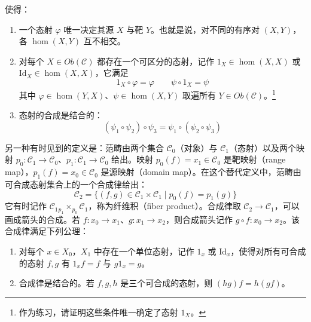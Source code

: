 使得：

\begin{enumerate}
  \item 一个态射 $\varphi$ 唯一决定其源 $X$ 与靶 $Y$。也就是说，对不同的有序对 $(X,Y)$，各 $\hom(X,Y)$ 互不相交。
  \item 对每个 $X\in\mathit{Ob}(\mathcal{C})$ 都存在一个可区分的态射，记作 $1_X\in\hom(X,X)$ 或 $\mathrm{Id}_X\in\hom(X,X)$，它满足
  \begin{equation}
  1_X\circ\varphi=\varphi \qquad \psi\circ 1_X=\psi
  \tag{K.4}
  \label{eq:K.4}
  \end{equation}
  其中 $\varphi\in\hom(Y,X)$、$\psi\in\hom(X,Y)$ 取遍所有 $Y\in\mathit{Ob}(\mathcal{C})$。\footnote{作为练习，请证明这些条件唯一确定了态射 $1_X$。}
  \item 态射的合成是结合的：
  \begin{equation}
  (\psi_1\circ\psi_2)\circ\psi_3=\psi_1\circ(\psi_2\circ\psi_3)
  \tag{K.5}
  \label{eq:K.5}
  \end{equation}
\end{enumerate}


另一种有时见到的定义是：范畴由两个集合 $\mathcal{C}_0$（对象）与 $\mathcal{C}_1$（态射）以及两个映射 $p_0:\mathcal{C}_1\to\mathcal{C}_0$、$p_1:\mathcal{C}_1\to\mathcal{C}_0$ 给出。映射 $p_0(f)=x_1\in\mathcal{C}_0$ 是靶映射（range map），$p_1(f)=x_0\in\mathcal{C}_0$ 是源映射（domain map）。在这个替代定义中，范畴由可合成态射集合上的一个合成律给出：
\begin{equation}
\mathcal{C}_2=\{(f,g)\in\mathcal{C}_1\times\mathcal{C}_1\mid p_0(f)=p_1(g)\}
\tag{K.6}
\label{eq:K.6}
\end{equation}
它有时记作 $\mathcal{C}_1{}_{p_1}\!\times_{p_0}\mathcal{C}_1$，称为纤维积（fiber product）。合成律取 $\mathcal{C}_2\to\mathcal{C}_1$，可以画成箭头的合成。若 $f:x_0\to x_1$、$g:x_1\to x_2$，则合成箭头记作 $g\circ f:x_0\to x_2$。该合成律满足下列公理：

\begin{enumerate}
  \item 对每个 $x\in X_0$，$X_1$ 中存在一个单位态射，记作 $1_x$ 或 $\mathrm{Id}_x$，使得对所有可合成的态射 $f,g$ 有 $1_xf=f$ 与 $g1_x=g$。
  \item 合成律是结合的。若 $f,g,h$ 是三个可合成的态射，则 $(hg)f=h(gf)$。
\end{enumerate}

